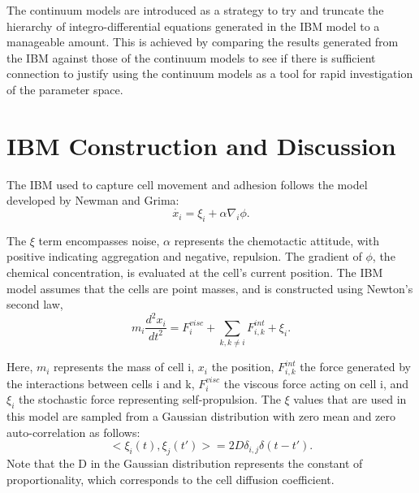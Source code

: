 \documentclass[12pt,letterpaper,cm]{article}
\renewcommand{\.}{\cdot}
\newcommand{\<}{\langle}
\renewcommand{\>}{\rangle}
\begin{document}
	The continuum models are introduced as a strategy to try and truncate the hierarchy of integro-differential equations generated in the IBM model to a manageable amount.  This is achieved by comparing the results generated from the IBM against those of the continuum models to see if there is sufficient connection to justify using the continuum models as a tool for rapid investigation of the parameter space.  
	
	\section{IBM Construction and Discussion}
	
	\indent 
	
	The IBM used to capture cell movement and adhesion follows the model developed by Newman and Grima: 
	\[\dot{x_i} = \xi_i + \alpha \nabla_i \phi.\]  
	
	The $\xi$ term encompasses noise, $\alpha$ represents the chemotactic attitude, with positive indicating aggregation and negative, repulsion. The gradient of $\phi$, the chemical concentration, is evaluated at the cell's current position.  The IBM model assumes that the cells are point masses, and is constructed using Newton's second law, 
	\[m_i \frac{d^{2}x_{i}}{dt^2}=F^{visc}_i+\sum_{k,k\neq i}F^{int}_{i,k}+\xi_i.\]
	
	Here, $m_i$ represents the mass of cell i, $x_i$ the position, $F^{int}_{i,k}$ the force generated by the interactions between cells i and k, $F^{visc}_i$ the viscous force acting on cell i, and $\xi_i$ the stochastic force representing self-propulsion.  The $\xi$ values that are used in this model are sampled from a Gaussian distribution with zero mean and zero auto-correlation as follows:
	\[
	<\xi_i(t),\xi_j(t')>=2D\delta_{i,j}\delta(t-t').
	\] 
	Note that the D in the Gaussian distribution represents the constant of proportionality, which corresponds to the cell diffusion coefficient.

	
	\printbibliography
	
	
	
\end{document}
